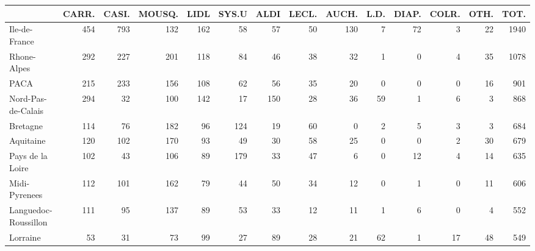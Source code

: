 \documentclass[11pt]{article}
\begin{document}
\begin{table}[H]
\footnotesize
\setlength{\tabcolsep}{2pt}

\begin{tabular}{lrrrrrrrrrrrrr}
\toprule
{} &  CARR. &  CASI. &     MOUSQ. &       LIDL &  SYS.U &       ALDI &  LECL. &      AUCH. &       L.D. &      DIAP. &      COLR. &       OTH. &       TOT. \\
\midrule
Ile-de-France              &    454 &    793 &        132 &        162 &     58 &         57 &     50 &        130 &          7 &         72 &          3 &         22 &       1940 \\
Rhone-Alpes                &    292 &    227 &        201 &        118 &     84 &         46 &     38 &         32 &          1 &          0 &          4 &         35 &       1078 \\
PACA &    215 &    233 &        156 &        108 &     62 &         56 &     35 &         20 &          0 &          0 &          0 &         16 &        901 \\
Nord-Pas-de-Calais         &    294 &     32 &        100 &        142 &     17 &        150 &     28 &         36 &         59 &          1 &          6 &          3 &        868 \\
Bretagne                   &    114 &     76 &        182 &         96 &    124 &         19 &     60 &          0 &          2 &          5 &          3 &          3 &        684 \\
Aquitaine                  &    120 &    102 &        170 &         93 &     49 &         30 &     58 &         25 &          0 &          0 &          2 &         30 &        679 \\
Pays de la Loire           &    102 &     43 &        106 &         89 &    179 &         33 &     47 &          6 &          0 &         12 &          4 &         14 &        635 \\
Midi-Pyrenees              &    112 &    101 &        162 &         79 &     44 &         50 &     34 &         12 &          0 &          1 &          0 &         11 &        606 \\
Languedoc-Roussillon       &    111 &     95 &        137 &         89 &     53 &         33 &     12 &         11 &          1 &          6 &          0 &          4 &        552 \\
Lorraine                   &     53 &     31 &         73 &         99 &     27 &         89 &     28 &         21 &         62 &          1 &         17 &         48 &        549 \\

\end{tabular}
\end{table}
\end{document}
